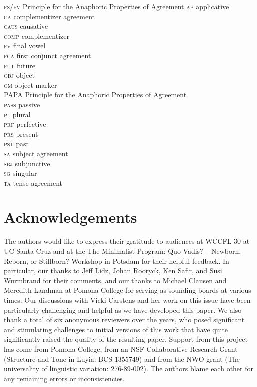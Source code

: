 \documentclass[output=paper
,modfonts
,nonflat
]{langsci/langscibook}
\begin{document}
\begin{multicols}{2}
	\begin{tabbing}
		\textsc{fs/fv}\hspace{5mm} \= Principle for the Anaphoric Properties of Agreement\kill
\textsc{ap} \> applicative \\ 
\textsc{ca} \> complementizer agreement \\ 
\textsc{caus} \> causative \\ 
\textsc{comp} \> complementizer \\
\textsc{fv} \> final vowel \\ 
\textsc{fca} \> first conjunct agreement \\
\textsc{fut} \> future \\
\textsc{obj} \> object \\
\textsc{om} \> object marker \\
PAPA \> Principle for the Anaphoric Properties of Agreement \\
\textsc{pass} \> passive \\
\textsc{pl} \> plural \\
\textsc{prf} \> perfective \\ 
\textsc{prs} \> present \\ 
\textsc{pst} \> past \\ 
\textsc{sa} \> subject agreement \\ 
\textsc{sbj} \> subjunctive \\
\textsc{sg} \> singular \\
\textsc{ta} \> tense agreement \\
\end{tabbing}
\end{multicols}

\section*{Acknowledgements}
The authors would like to express their gratitude to audiences at WCCFL 30 at UC-Santa Cruz and at the The Minimalist Program: Quo Vadis? – Newborn, Reborn, or Stillborn? Workshop in Potsdam for their helpful feedback. In particular, our thanks to Jeff Lidz, Johan Rooryck, Ken Safir, and Susi Wurmbrand for their comments, and our thanks to Michael Clausen and Meredith Landman at Pomona College for serving as sounding boards at various times. Our discussions with Vicki Carstens and her work on this issue have been particularly challenging and helpful as we have developed this paper. We also thank a total of six anonymous reviewers over the years, who posed significant and stimulating challenges to initial versions of this work that have quite significantly raised the quality of the resulting paper. Support from this project has come from Pomona College, from an NSF Collaborative Research Grant (Structure and Tone in Luyia: BCS-1355749) and from the NWO-grant (The universality of linguistic variation: 276-89-002). The authors blame each other for any remaining errors or inconsistencies.



\sloppy
\printbibliography[heading=subbibliography,notkeyword=this]
\end{document}
